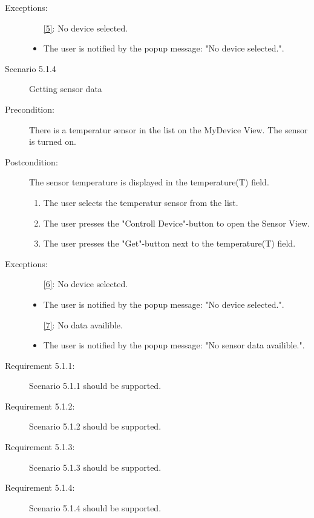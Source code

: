 \documentclass[a4paper]{article}
\begin{document}
\begin{description}
\item[Exceptions:]

\begin{itemize}
\item [\ref{5}:] No device selected.
\item The user is notified by the popup message: "No device selected.".
\end{itemize}

\item[]

\item[Scenario 5.1.4] Getting sensor data
\item[Precondition:] There is a temperatur sensor in the list on the MyDevice View. The sensor is turned on.
\item[Postcondition:] The sensor temperature is displayed in the temperature(T) field.
\begin{enumerate}
\item The user selects the temperatur sensor from the list.
\item \label{6} The user presses the "Controll Device"-button to open the Sensor View.
\item \label{7} The user presses the "Get"-button next to the temperature(T) field.

\end{enumerate}

\item[Exceptions:]
\item[]

\begin{itemize}
\item [\ref{6}:] No device selected.
\item The user is notified by the popup message: "No device selected.".
\item [\ref{7}:] No data availible.
\item The user is notified by the popup message: "No sensor data availible.".
\end{itemize}

\item[Requirement 5.1.1:] Scenario 5.1.1 should be supported.
\item[Requirement 5.1.2:] Scenario 5.1.2 should be supported.
\item[Requirement 5.1.3:] Scenario 5.1.3 should be supported.
\item[Requirement 5.1.4:] Scenario 5.1.4 should be supported.

\end{description}
\end{document}
